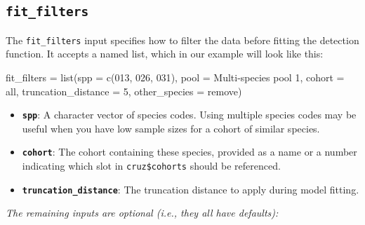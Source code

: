 \documentclass[
]{book}
\newenvironment{Shaded}{\begin{snugshade}}{\end{snugshade}}
\newcommand{\AttributeTok}[1]{\textcolor[rgb]{0.77,0.63,0.00}{#1}}
\newcommand{\DecValTok}[1]{\textcolor[rgb]{0.00,0.00,0.81}{#1}}
\newcommand{\FunctionTok}[1]{\textcolor[rgb]{0.00,0.00,0.00}{#1}}
\newcommand{\NormalTok}[1]{#1}
\newcommand{\OtherTok}[1]{\textcolor[rgb]{0.56,0.35,0.01}{#1}}
\newcommand{\StringTok}[1]{\textcolor[rgb]{0.31,0.60,0.02}{#1}}
\begin{document}
\hypertarget{fit_filters}{%
\subsection*{\texorpdfstring{\texttt{fit\_filters}}{fit\_filters}}\label{fit_filters}}

The \texttt{fit\_filters} input specifies how to filter the data before fitting the detection function. It accepts a named list, which in our example will look like this:

\begin{Shaded}
\begin{Highlighting}[]
\NormalTok{fit\_filters }\OtherTok{=} \FunctionTok{list}\NormalTok{(}\AttributeTok{spp =} \FunctionTok{c}\NormalTok{(}\StringTok{\textquotesingle{}013\textquotesingle{}}\NormalTok{, }\StringTok{\textquotesingle{}026\textquotesingle{}}\NormalTok{, }\StringTok{\textquotesingle{}031\textquotesingle{}}\NormalTok{), }
                   \AttributeTok{pool =} \StringTok{\textquotesingle{}Multi{-}species pool 1\textquotesingle{}}\NormalTok{,}
                   \AttributeTok{cohort =} \StringTok{\textquotesingle{}all\textquotesingle{}}\NormalTok{,}
                   \AttributeTok{truncation\_distance =} \DecValTok{5}\NormalTok{,}
                   \AttributeTok{other\_species =} \StringTok{\textquotesingle{}remove\textquotesingle{}}\NormalTok{)}
\end{Highlighting}
\end{Shaded}

\begin{itemize}
\item
  \textbf{\texttt{spp}}: A character vector of species codes. Using multiple species codes may be useful when you have low sample sizes for a cohort of similar species.
\item
  \textbf{\texttt{cohort}}: The cohort containing these species, provided as a name or a number indicating which slot in \texttt{cruz\$cohorts} should be referenced.
\item
  \textbf{\texttt{truncation\_distance}}: The truncation distance to apply during model fitting.
\end{itemize}

\emph{The remaining inputs are optional (i.e., they all have defaults):}
\end{document}

